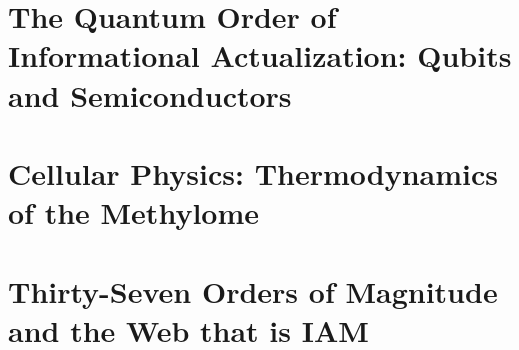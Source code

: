 \documentclass[11pt,oneside,openany]{book}
\begin{document}
\part{The Quantum Order of Informational Actualization: Qubits and Semiconductors}\label{part:3}









\part{Cellular Physics: Thermodynamics of the Methylome}\label{part:4}




































\part{Thirty-Seven Orders of Magnitude and the Web that is IAM}\label{part:5}















\appendix












\backmatter

{\raggedright\sloppy

}
\end{document}
